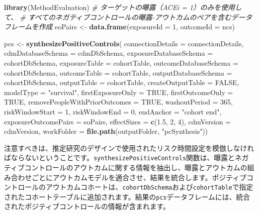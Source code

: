 \documentclass[
  11pt]{book}
\newenvironment{Shaded}{\begin{snugshade}}{\end{snugshade}}
\newcommand{\AttributeTok}[1]{\textcolor[rgb]{0.13,0.29,0.53}{#1}}
\newcommand{\CommentTok}[1]{\textcolor[rgb]{0.56,0.35,0.01}{\textit{#1}}}
\newcommand{\ConstantTok}[1]{\textcolor[rgb]{0.56,0.35,0.01}{#1}}
\newcommand{\DecValTok}[1]{\textcolor[rgb]{0.00,0.00,0.81}{#1}}
\newcommand{\FloatTok}[1]{\textcolor[rgb]{0.00,0.00,0.81}{#1}}
\newcommand{\FunctionTok}[1]{\textcolor[rgb]{0.13,0.29,0.53}{\textbf{#1}}}
\newcommand{\NormalTok}[1]{#1}
\newcommand{\OtherTok}[1]{\textcolor[rgb]{0.56,0.35,0.01}{#1}}
\newcommand{\StringTok}[1]{\textcolor[rgb]{0.31,0.60,0.02}{#1}}
\theoremstyle{definition}
\theoremstyle{definition}
\theoremstyle{definition}
\theoremstyle{definition}
\theoremstyle{remark}
\begin{document}
\begin{Shaded}
\begin{Highlighting}[]
\FunctionTok{library}\NormalTok{(MethodEvaluation)}
\CommentTok{\# ターゲットの曝露（ACEi = 1）のみを使用して、}
\CommentTok{\# すべてのネガティブコントロールの曝露{-}アウトカムのペアを含むデータフレームを作成}
\NormalTok{eoPairs }\OtherTok{\textless{}{-}} \FunctionTok{data.frame}\NormalTok{(}\AttributeTok{exposureId =} \DecValTok{1}\NormalTok{,}
                      \AttributeTok{outcomeId =}\NormalTok{ ncs)}

\NormalTok{pcs }\OtherTok{\textless{}{-}} \FunctionTok{synthesizePositiveControls}\NormalTok{(}
  \AttributeTok{connectionDetails =}\NormalTok{ connectionDetails,}
  \AttributeTok{cdmDatabaseSchema =}\NormalTok{ cdmDbSchema,}
  \AttributeTok{exposureDatabaseSchema =}\NormalTok{ cohortDbSchema,}
  \AttributeTok{exposureTable =}\NormalTok{ cohortTable,}
  \AttributeTok{outcomeDatabaseSchema =}\NormalTok{ cohortDbSchema,}
  \AttributeTok{outcomeTable =}\NormalTok{ cohortTable,}
  \AttributeTok{outputDatabaseSchema =}\NormalTok{ cohortDbSchema,}
  \AttributeTok{outputTable =}\NormalTok{ cohortTable,}
  \AttributeTok{createOutputTable =} \ConstantTok{FALSE}\NormalTok{,}
  \AttributeTok{modelType =} \StringTok{"survival"}\NormalTok{,}
  \AttributeTok{firstExposureOnly =} \ConstantTok{TRUE}\NormalTok{,}
  \AttributeTok{firstOutcomeOnly =} \ConstantTok{TRUE}\NormalTok{,}
  \AttributeTok{removePeopleWithPriorOutcomes =} \ConstantTok{TRUE}\NormalTok{,}
  \AttributeTok{washoutPeriod =} \DecValTok{365}\NormalTok{,}
  \AttributeTok{riskWindowStart =} \DecValTok{1}\NormalTok{,}
  \AttributeTok{riskWindowEnd =} \DecValTok{0}\NormalTok{,}
  \AttributeTok{endAnchor =} \StringTok{"cohort end"}\NormalTok{,}
  \AttributeTok{exposureOutcomePairs =}\NormalTok{ eoPairs,}
  \AttributeTok{effectSizes =} \FunctionTok{c}\NormalTok{(}\FloatTok{1.5}\NormalTok{, }\DecValTok{2}\NormalTok{, }\DecValTok{4}\NormalTok{),}
  \AttributeTok{cdmVersion =}\NormalTok{ cdmVersion,}
  \AttributeTok{workFolder =} \FunctionTok{file.path}\NormalTok{(outputFolder, }\StringTok{"pcSynthesis"}\NormalTok{))}
\end{Highlighting}
\end{Shaded}

注意すべきは、推定研究のデザインで使用されたリスク時間設定を模倣しなければならないということです。\texttt{synthesizePositiveControls}関数は、曝露とネガティブコントロールのアウトカムに関する情報を抽出し、曝露とアウトカムの組み合わせごとにアウトカムモデルを適合させ、結果を統合します。ポジティブコントロールのアウトカムコホートは、\texttt{cohortDbSchema}および\texttt{cohortTable}で指定されたコホートテーブルに追加されます。結果の\texttt{pcs}データフレームには、統合されたポジティブコントロールの情報が含まれます。
\end{document}
